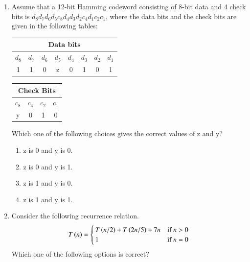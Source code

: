 \documentclass[a4paper, 11pt]{article}
\begin{document}
\begin{enumerate}
    \item Assume that a 12-bit Hamming codeword consisting of 8-bit data and 4 check bits is $d_8 d_7 d_6 d_5 c_8 d_4 d_3 d_2 c_4 d_1 c_2 c_1$, where the data bits and the check bits are given in the following tables:\\
    \begin{minipage}{0.45\textwidth}
    \centering
        \begin{tabular}{|c|c|c|c|c|c|c|c|}
            \hline
            \multicolumn{8}{|c|}{\textbf{Data bits}} \\
            \hline
            $d_8$ & $d_7$ & $d_6$ & $d_5$ & $d_4$ & $d_3$ & $d_2$ & $d_1$ \\
            \hline
            1 & 1 & 0 & z & 0 & 1 & 0 & 1 \\
            \hline
    \end{tabular}
    \end{minipage}
    \begin{minipage}{0.45\textwidth}
    \centering
        \begin{tabular}{|c|c|c|c|}
            \hline
            \multicolumn{4}{|c|}{\textbf{Check Bits}} \\
            \hline
            $c_8$&$c_4$&$c_2$&$c_1$\\
            \hline
            y & 0 & 1 & 0\\
            \hline
    \end{tabular}
    \end{minipage}
    Which one of the following choices gives the correct values of z and y?
    \begin{enumerate}
        \item z is 0 and y is 0.
        \item z is 0 and y is 1.
        \item z is 1 and y is 0.
        \item z is 1 and y is 1.
    \end{enumerate}
    \hfill{}
    
    \item Consider the following recurrence relation.
    \[ T\left(n\right) = \begin{cases} T\left(n/2\right) + T\left(2n/5\right) + 7n & \text{if } n > 0 \\ 1 & \text{if } n=0 \end{cases} \]
    Which one of the following options is correct?
    \begin{enumerate}
    \end{enumerate}
    \hfill{}
    

\end{enumerate}
\end{document}

